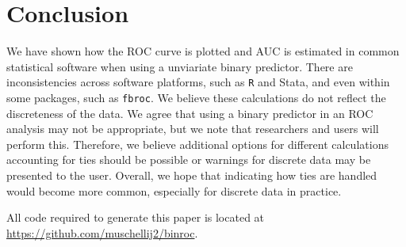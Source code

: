 \documentclass[article]{jss}
\begin{document}
\hypertarget{conclusion}{%
\section{Conclusion}\label{conclusion}}

We have shown how the ROC curve is plotted and AUC is estimated in
common statistical software when using a unviariate binary predictor.
There are inconsistencies across software platforms, such as \texttt{R}
and Stata, and even within some packages, such as \texttt{fbroc}. We
believe these calculations do not reflect the discreteness of the data.
We agree that using a binary predictor in an ROC analysis may not be
appropriate, but we note that researchers and users will perform this.
Therefore, we believe additional options for different calculations
accounting for ties should be possible or warnings for discrete data may
be presented to the user. Overall, we hope that indicating how ties are
handled would become more common, especially for discrete data in
practice.

All code required to generate this paper is located at
\url{https://github.com/muschellij2/binroc}.


\end{document}
